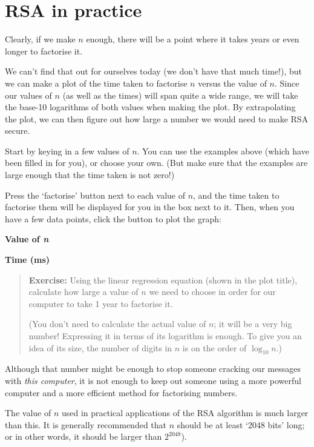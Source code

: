 \documentclass[
  letterpaper,
  DIV=11,
  numbers=noendperiod]{scrreprt}
\begin{document}
\hypertarget{rsa-in-practice}{%
\section{RSA in practice}\label{rsa-in-practice}}

Clearly, if we make \(n\) enough, there will be a point where it takes
years or even longer to factorise it.

We can't find that out for ourselves today (we don't have that much
time!), but we can make a plot of the time taken to factorise \(n\)
versus the value of \(n\). Since our values of \(n\) (as well as the
times) will span quite a wide range, we will take the base-10 logarithms
of both values when making the plot. By extrapolating the plot, we can
then figure out how large a number we would need to make RSA secure.

Start by keying in a few values of \(n\). You can use the examples above
(which have been filled in for you), or choose your own. (But make sure
that the examples are large enough that the time taken is not zero!)

Press the `factorise' button next to each value of \(n\), and the time
taken to factorise them will be displayed for you in the box next to it.
Then, when you have a few data points, click the button to plot the
graph:

\hypertarget{rsa-plot-inputs}{}
\textbf{Value of \emph{n} }

\textbf{Time (ms)}

\protect\hypertarget{plot-feedback}{}{}

\begin{quote}
\textbf{Exercise:} Using the linear regression equation (shown in the
plot title), calculate how large a value of \(n\) we need to choose in
order for our computer to take 1 year to factorise it.

(You don't need to calculate the actual value of \(n\); it will be a
very big number! Expressing it in terms of its logarithm is enough. To
give you an idea of its size, the number of digits in \(n\) is on the
order of \(\log_{10}n\).)
\end{quote}

Although that number might be enough to stop someone cracking our
messages with \emph{this computer}, it is not enough to keep out someone
using a more powerful computer and a more efficient method for
factorising numbers.

The value of \(n\) used in practical applications of the RSA algorithm
is much larger than this. It is generally recommended that \(n\) should
be at least `2048 bits' long; or in other words, it should be larger
than \(2^{2048}\)).
\end{document}
